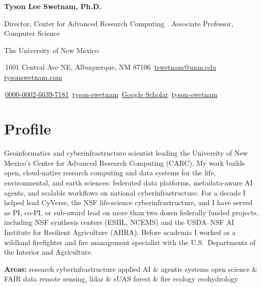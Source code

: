 \documentclass[11pt,letterpaper]{article}
\begin{document}
\begin{center}
  {\fontsize{22}{26}\selectfont\bfseries Tyson Lee Swetnam, \textmd{Ph.D.}}\par\vspace{5pt}
  {\normalsize\color{cherry}Director, Center for Advanced Research Computing \,\textbar\, Associate Professor, Computer Science}\par\vspace{2pt}
  {\small\color{muted}The University of New Mexico}\par\vspace{7pt}
  {\small
   \faMapMarker*\,1601 Central Ave NE, Albuquerque, NM 87106 \quad
   \faEnvelope[regular]\,\href{mailto:tswetnam@unm.edu}{tswetnam@unm.edu} \quad
   \faGlobe\,\href{https://tysonswetnam.com}{tysonswetnam.com}\par\vspace{2pt}
   \faOrcid\,\href{https://orcid.org/0000-0002-6639-7181}{0000-0002-6639-7181} \quad
   \faGithub\,\href{https://github.com/tyson-swetnam}{tyson-swetnam} \quad
   \faGraduationCap\,\href{https://scholar.google.com/citations?user=HeftZR8AAAAJ}{Google Scholar} \quad
   \faLinkedin\,\href{https://www.linkedin.com/in/tyson-swetnam}{tyson-swetnam}}
\end{center}
\vspace{2pt}

\section{Profile}
Geoinformatics and cyberinfrastructure scientist leading the University of New Mexico's Center for Advanced Research Computing (CARC). My work builds open, cloud-native research computing and data systems for the life, environmental, and earth sciences: federated data platforms, metadata-aware AI agents, and scalable workflows on national cyberinfrastructure. For a decade I helped lead CyVerse, the NSF life-science cyberinfrastructure, and I have served as PI, co-PI, or sub-award lead on more than two dozen federally funded projects, including NSF synthesis centers (ESIIL, NCEMS) and the USDA--NSF AI Institute for Resilient Agriculture (AIIRA). Before academia I worked as a wildland firefighter and fire management specialist with the U.S.\ Departments of the Interior and Agriculture.

\smallskip
{\small\color{muted}\textbf{Areas:} research cyberinfrastructure \textbullet{} applied AI \& agentic systems \textbullet{} open science \& FAIR data \textbullet{} remote sensing, lidar \& sUAS \textbullet{} forest \& fire ecology \textbullet{} ecohydrology}
\end{document}
